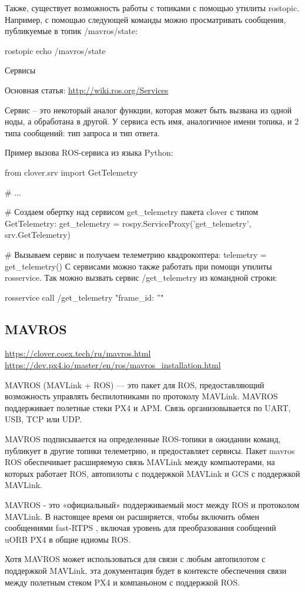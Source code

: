 Также, существует возможность работы с топиками с помощью утилиты rostopic. Например, с помощью следующей команды можно просматривать сообщения, публикуемые в топик /mavros/state:

rostopic echo /mavros/state

Сервисы

Основная статья: \url{http://wiki.ros.org/Services}

Сервис – это некоторый аналог функции, которая может быть вызвана из одной ноды, а обработана в другой. У сервиса есть имя, аналогичное имени топика, и 2 типа сообщений: тип запроса и тип ответа.

\begin{Program}[H]
	\caption{Пример вызова ROS-сервиса из языка Python:} \label{lst:1}
	\begin{MyCode}
from clover.srv import GetTelemetry

# ...

# Создаем обертку над сервисом get\_telemetry пакета clover с типом GetTelemetry:
get\_telemetry = rospy.ServiceProxy('get\_telemetry', srv.GetTelemetry)

# Вызываем сервис и получаем телеметрию квадрокоптера:
telemetry = get\_telemetry()
С сервисами можно также работать при помощи утилиты rosservice. Так можно вызвать сервис /get\_telemetry из командной строки:

rosservice call /get\_telemetry "{frame\_id: ''}"
	\end{MyCode}
\end{Program}


\subsection{MAVROS}
\url{https://clover.coex.tech/ru/mavros.html}
\url{https://dev.px4.io/master/en/ros/mavros\_installation.html}

MAVROS (MAVLink + ROS) — это пакет для ROS, предоставляющий возможность управлять беспилотниками по протоколу MAVLink. MAVROS поддерживает полетные стеки PX4 и APM. Связь организовывается по UART, USB, TCP или UDP.

MAVROS подписывается на определенные ROS-топики в ожидании команд, публикует в другие топики телеметрию, и предоставляет сервисы.
Пакет mavros ROS обеспечивает расширяемую связь MAVLink между компьютерами, на которых работает ROS, автопилоты с поддержкой MAVLink и GCS с поддержкой MAVLink.

MAVROS - это «официальный» поддерживаемый мост между ROS и протоколом MAVLink. В настоящее время он расширяется, чтобы включить обмен сообщениями fast-RTPS , включая уровень для преобразования сообщений uORB PX4 в общие идиомы ROS.

Хотя MAVROS может использоваться для связи с любым автопилотом с поддержкой MAVLink, эта документация будет в контексте обеспечения связи между полетным стеком PX4 и компаньоном с поддержкой ROS.
